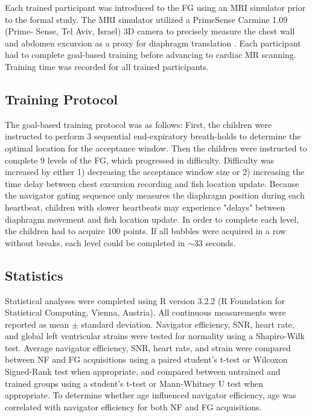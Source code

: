 	Each trained participant was introduced to the FG using	an MRI simulator prior to the formal study. The MRI simulator utilized a PrimeSense Carmine 1.09 (Prime- Sense, Tel Aviv, Israel) 3D camera to precisely measure the chest wall and abdomen excursion as a proxy for diaphragm translation \cite{Harte2016,Heß2015}. Each participant had to complete goal-based training before advancing to cardiac MR scanning. Training time was recorded for all trained participants.
	
\subsection{Training Protocol}
	The goal-based training protocol was as follows: First, the children were instructed to perform 3 sequential end-expiratory breath-holds to determine the optimal location for the acceptance window. Then the children were instructed to complete 9 levels of the FG, which progressed in difficulty. Difficulty was increased by either 1) decreasing the acceptance window size or 2) increasing the time delay between chest excursion recording and fish location update. Because the navigator gating sequence only measures the diaphragm position during each heartbeat, children with slower heartbeats may experience "delays" between diaphragm movement and fish location update. In order to complete each level, the children had to acquire 100 points. If all bubbles were acquired in a row without breaks, each level could be completed in $\sim$33 seconds.

\subsection{Statistics}
	Statistical analyses were completed using R version 3.2.2 (R Foundation for Statistical Computing, Vienna, Austria). All continuous measurements were reported as mean $\pm$ standard deviation. Navigator efficiency, SNR, heart rate, and global left ventricular strains were tested for normality using a Shapiro-Wilk test. Average navigator efficiency, SNR, heart rate, and strain were compared between NF and FG acquisitions using a paired student's t-test or Wilcoxon Signed-Rank test when appropriate, and compared between untrained and trained groups using a student's t-test or Mann-Whitney U test when appropriate. To determine whether age influenced navigator efficiency, age was correlated with navigator efficiency for both NF and FG acquisitions.
	

